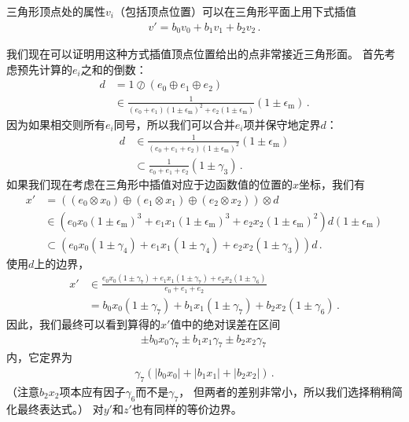 三角形顶点处的属性$v_i$（包括顶点位置）可以在三角形平面上用下式插值
\begin{align*}
    v'=b_0v_0+b_1v_1+b_2v_2\, .
\end{align*}

我们现在可以证明用这种方式插值顶点位置给出的点非常接近三角形面。
首先考虑预先计算的$e_i$之和的倒数：
\begin{align*}
    d & =1\oslash(e_0\oplus e_1\oplus e_2)                                                                                \\
      & \in\frac{1}{(e_0+e_1)(1\pm\epsilon_{\mathrm{m}})^2+e_2(1\pm\epsilon_{\mathrm{m}})}(1\pm\epsilon_{\mathrm{m}})\, .
\end{align*}
因为如果相交则所有$e_i$同号，所以我们可以合并$e_i$项并保守地定界$d$：
\begin{align*}
    d & \in\frac{1}{(e_0+e_1+e_2)(1\pm\epsilon_{\mathrm{m}})^2}(1\pm\epsilon_{\mathrm{m}}) \\
      & \subset \frac{1}{e_0+e_1+e_2}(1\pm\gamma_3)\, .
\end{align*}
如果我们现在考虑在三角形中插值对应于边函数值的位置的$x$坐标，我们有
\begin{align*}
    x' & =((e_0\otimes x_0)\oplus(e_1\otimes x_1)\oplus(e_2\otimes x_2))\otimes d                                                                     \\
       & \in(e_0x_0(1\pm\epsilon_{\mathrm{m}})^3+e_1x_1(1\pm\epsilon_{\mathrm{m}})^3+e_2x_2(1\pm\epsilon_{\mathrm{m}})^2)d(1\pm\epsilon_{\mathrm{m}}) \\
       & \subset (e_0x_0(1\pm\gamma_4)+e_1x_1(1\pm\gamma_4)+e_2x_2(1\pm\gamma_3))d\, .
\end{align*}
使用$d$上的边界，
\begin{align*}
    x' & \in\frac{e_0x_0(1\pm\gamma_7)+e_1x_1(1\pm\gamma_7)+e_2x_2(1\pm\gamma_6)}{e_0+e_1+e_2} \\
       & =b_0x_0(1\pm\gamma_7)+b_1x_1(1\pm\gamma_7)+b_2x_2(1\pm\gamma_6)\, .
\end{align*}
因此，我们最终可以看到算得的$x'$值中的绝对误差在区间
\begin{align*}
    \pm b_0x_0\gamma_7\pm b_1x_1\gamma_7\pm b_2x_2\gamma_7\,
\end{align*}
内，它定界为
\begin{align}\label{eq:3.15}
    \gamma_7(|b_0x_0|+|b_1x_1|+|b_2x_2|)\, .
\end{align}
（注意$b_2x_2$项本应有因子$\gamma_6$而不是$\gamma_7$，
但两者的差别非常小，所以我们选择稍稍简化最终表达式。）
对$y'$和$z'$也有同样的等价边界。

